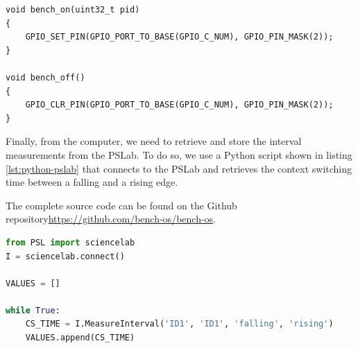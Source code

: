 \begin{lstlisting}[style=CStyle, caption={\texttt{bench\_on()} and \texttt{bench\_off()} implementation in Contiki}, label={lst:external-on-off-code}]
void bench_on(uint32_t pid)
{
    GPIO_SET_PIN(GPIO_PORT_TO_BASE(GPIO_C_NUM), GPIO_PIN_MASK(2));
}

void bench_off()
{
    GPIO_CLR_PIN(GPIO_PORT_TO_BASE(GPIO_C_NUM), GPIO_PIN_MASK(2));
}
\end{lstlisting}

Finally, from the computer, we need to retrieve and store the interval measurements from the PSLab.
To do so, we use a Python script shown in listing \ref{lst:python-pslab} that connects to the PSLab and retrieves the context switching time between a falling and a rising edge.

The complete source code can be found on the Github repository\url{https://github.com/bench-os/bench-os}.

\begin{lstlisting}[style=CStyle, language=python, caption={Python script to communicate with the PSLab and retrieve the interval measurements}, label={lst:python-pslab}]
from PSL import sciencelab
I = sciencelab.connect()

VALUES = []

while True:
    CS_TIME = I.MeasureInterval('ID1', 'ID1', 'falling', 'rising')
    VALUES.append(CS_TIME)
\end{lstlisting}